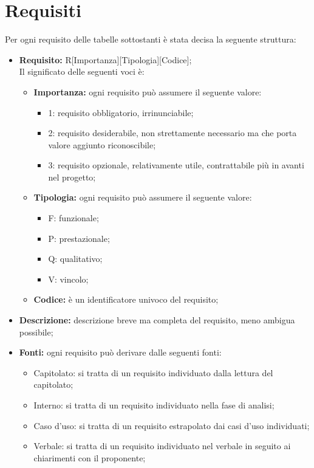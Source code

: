 \section{Requisiti}
Per ogni requisito delle tabelle sottostanti è stata decisa la seguente struttura: 
\begin{itemize}
\item\textbf{Requisito:} R[Importanza][Tipologia][Codice];\\
Il significato delle seguenti voci è:
	\begin{itemize}
	\item\textbf{Importanza:} ogni requisito può assumere il seguente valore:
		\begin{itemize}
		\item 1: requisito obbligatorio, irrinunciabile;
		\item 2: requisito desiderabile, non strettamente necessario ma che porta valore aggiunto riconoscibile;
		\item 3: requisito opzionale, relativamente utile, contrattabile più in avanti nel progetto;
		\end{itemize}
	\item\textbf{Tipologia:} ogni requisito può assumere il seguente valore:
		\begin{itemize}
		\item F: funzionale;
		\item P: prestazionale;
		\item Q: qualitativo;
		\item V: vincolo;
		\end{itemize}
	\item\textbf{Codice:} è un identificatore univoco del requisito;
	\end{itemize}
\item\textbf{Descrizione:} descrizione breve ma completa del requisito, meno ambigua possibile;
\item\textbf{Fonti:} ogni requisito può derivare dalle seguenti fonti:
	\begin{itemize}
		\item Capitolato: si tratta di un requisito individuato dalla lettura del capitolato;
		\item Interno: si tratta di un requisito individuato nella fase di analisi;
		\item Caso d'uso: si tratta di un requisito estrapolato dai casi d'uso individuati;
		\item Verbale: si tratta di un requisito individuato nel verbale in seguito ai chiarimenti con il proponente;
	\end{itemize}
\end{itemize}


